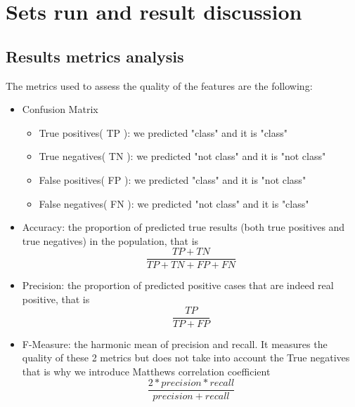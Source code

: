 
\chapter{Sets run and result discussion} %
\label{Sets run and result discussion} %

\section{Results metrics analysis}
The metrics used to assess the quality of the features are the following:
\begin{itemize}
\item Confusion Matrix
\begin{itemize}
\item True positives( TP ): we predicted "class" and it is "class"
\item True negatives( TN ): we predicted "not class" and it is "not class"
\item False positives( FP ): we predicted "class" and it is "not class"
\item False negatives( FN ): we predicted "not class" and it is "class"
\end{itemize}
\item Accuracy: the proportion of predicted true results (both true positives and true negatives) in the population, that is 
\begin{equation}
\frac{TP+TN}{TP+TN+FP+FN}
\end{equation}
\item Precision: the proportion of predicted positive cases that are indeed real positive, that is 
 \begin{equation}
\frac{TP}{TP+FP}
 \end{equation}
\item F-Measure: the harmonic mean of precision and recall. It measures the quality of these 2 metrics but does not take into account the True negatives that is why we introduce Matthews correlation coefficient
\begin{equation}
\frac{2*precision*recall}{precision+recall}
\end{equation}

\end{itemize}
